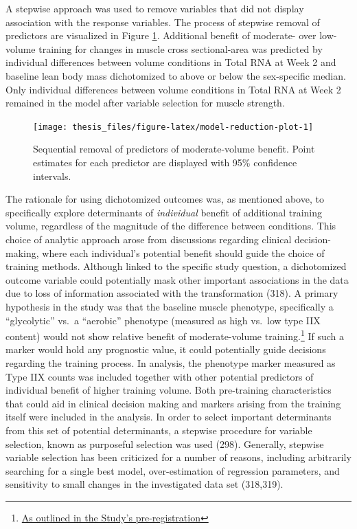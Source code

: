 \documentclass[twoside,10pt]{gihclass} %
\begin{document}
A stepwise approach was used to remove variables that did not display association with the response variables. The process of stepwise removal of predictors are visualized in Figure \ref{fig:model-reduction-plot}.
Additional benefit of moderate- over low-volume training for changes in muscle cross sectional-area was predicted by individual differences between volume conditions in Total RNA at Week 2 and baseline lean body mass dichotomized to above or below the sex-specific median.
Only individual differences between volume conditions in Total RNA at Week 2 remained in the model after variable selection for muscle strength.
\begin{figure}

{\centering \texttt{[image: thesis\_files/figure-latex/model-reduction-plot-1]} 

}

\caption[Step-wise variable selection of determinants of moderate- over low-volume training benefit.]{Sequential removal of predictors of moderate-volume benefit. Point estimates for each predictor are displayed with 95\% confidence intervals.}\label{fig:model-reduction-plot}
\end{figure}
The rationale for using dichotomized outcomes was, as mentioned above, to specifically explore determinants of \emph{individual} benefit of additional training volume, regardless of the magnitude of the difference between conditions.
This choice of analytic approach arose from discussions regarding clinical decision-making, where each individual's potential benefit should guide the choice of training methods.
Although linked to the specific study question, a dichotomized outcome variable could potentially mask other important associations in the data due to loss of information associated with the transformation
(318).
A primary hypothesis in the study was that the baseline muscle phenotype, specifically a ``glycolytic'' vs.~a ``aerobic'' phenotype (measured as high vs.~low type IIX content) would not show relative benefit of moderate-volume training.\footnote{\href{https://clinicaltrials.gov/ct2/show/NCT02179307?term=lillehammer\&draw=2\&rank=9}{As outlined in the Study's pre-registration}}
If such a marker would hold any prognostic value, it could potentially guide decisions regarding the training process.
In analysis, the phenotype marker measured as Type IIX counts was included together with other potential predictors of individual benefit of higher training volume.
Both pre-training characteristics that could aid in clinical decision making and markers arising from the training itself were included in the analysis.
In order to select important determinants from this set of potential determinants, a stepwise procedure for variable selection, known as purposeful selection was used
(298).
Generally, stepwise variable selection has been criticized for a number of reasons, including arbitrarily searching for a single best model, over-estimation of regression parameters, and sensitivity to small changes in the investigated data set
(318,319).
\end{document}
